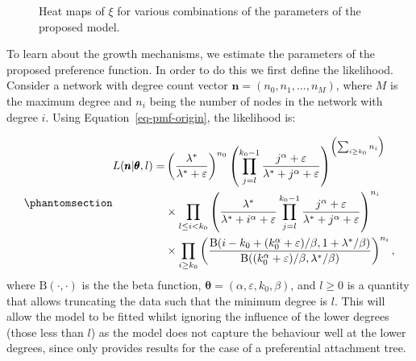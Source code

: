 \documentclass[
  sn-basic,
  10pt,
]{sn-jnl}
\theoremstyle{plain}
\theoremstyle{plain}
\theoremstyle{remark}
\begin{document}
\begin{figure}


\caption{\label{fig-polyheat}Heat maps of \(\xi\) for various
combinations of the parameters of the proposed model.}

\end{figure}%

\newpage

To learn about the growth mechanisms, we estimate the parameters of the
proposed preference function. In order to do this we first define the
likelihood. Consider a network with degree count vector
\(\pmb n = (n_0, n_1, \ldots, n_M)\), where \(M\) is the maximum degree
and \(n_i\) being the number of nodes in the network with degree \(i\).
Using Equation~\ref{eq-pmf-origin}, the likelihood is:

\begin{equation}\phantomsection\label{eq-llh}{
\begin{aligned}
L(\pmb n | \pmb \theta,l) = &\left(\frac{\lambda^*}{\lambda^*+\varepsilon}\right)^{n_0}\left(\prod_{j=l}^{k_0-1}\frac{j^\alpha +\varepsilon}{\lambda^* + j^\alpha +\varepsilon}\right)^{\left(\sum_{i\ge k_0}n_{i}\right)} \\ &\times \prod_{l \le i<k_0}\left(\frac{\lambda^*}{\lambda^* +i^\alpha + \varepsilon } \prod_{j=l}^{k_0-1}\frac{j^\alpha + \varepsilon}{\lambda^* + j^\alpha + \varepsilon}\right)^{n_i}\\ &\times \prod_{i\ge k_0}\left(\frac{\text{B}(i-k_0 + (k_0^\alpha + \varepsilon)/\beta,1+\lambda^*/\beta)}{\text{B}((k_0^\alpha + \varepsilon)/\beta,\lambda^*/\beta)}\right)^{n_i},
\end{aligned}
}\end{equation} where \(\text{B}(\cdot,\cdot)\) is the the beta
function, \(\pmb \theta = (\alpha, \varepsilon, k_0,\beta)\), and
\(l\ge0\) is a quantity that allows truncating the data such that the
minimum degree is \(l\). This will allow the model to be fitted whilst
ignoring the influence of the lower degrees (those less than \(l\)) as
the model does not capture the behaviour well at the lower degrees,
since \citet{rudas07} only provides results for the case of a
preferential attachment tree.
\end{document}
